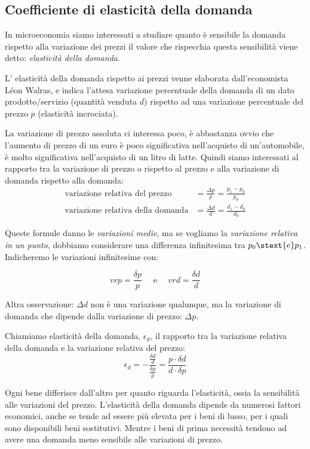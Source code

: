 \subsection{Coefficiente di elasticità della domanda}
\label{subsec:modelli_elasticita_domanda}

In microeconomia siamo interessati a studiare quanto è sensibile la domanda 
rispetto alla variazione dei prezzi il valore che rispecchia questa 
sensibilità viene detto: \emph{elasticità della domanda}.

L' elasticità della domanda rispetto ai prezzi venne elaborata 
dall'economista Léon Walras, e indica l'attesa variazione percentuale della 
domanda di un dato prodotto/servizio (quantità venduta \(d\)) rispetto ad una 
variazione percentuale del prezzo \(p\) (elasticità incrociata).

La variazione di prezzo assoluta ci interessa poco, è abbastanza ovvio che 
l'aumento di prezzo di un euro è poco significativa nell'acquisto di 
un'automobile, è molto significativa nell'acquisto di un litro di latte.
Quindi siamo interessati al rapporto tra la variazione di prezzo o rispetto 
al prezzo e alla variazione di domanda rispetto alla domanda:
\begin{align*}
\text{variazione relativa del prezzo} &= 
\frac{\Delta p}{p} = \frac{p_1 - p_0}{p_0} \\
\text{variazione relativa della domanda} &= 
\frac{\Delta d}{d} = \frac{d_1 - d_0}{d_0}
\end{align*}

Queste formule danno le \emph{variazioni medie}, ma se vogliamo la 
\emph{variazione relativa in un punto}, dobbiamo considerare una differenza 
infinitesima tra \(p_0 \stext{e} p_1\). 
Indicheremo le variazioni infinitesime con:

\[vrp = \frac{\delta p}{p} \quad \text{ e } \quad vrd = \frac{\delta d}{d}\]

Altra osservazione: \(\Delta d\) non è una variazione qualunque, ma la 
variazione di domanda che dipende dalla variazione di prezzo: \(\Delta p\).

Chiamiamo elasticità della domanda, \(\epsilon_d\), il rapporto tra la 
variazione relativa della domanda e la variazione relativa del prezzo:
\[\epsilon_d = -\frac {\frac {\delta d} {d} } { \frac {\delta p} {p}} =
\frac {p \cdot \delta d}{d \cdot \delta p}\]

Ogni bene differisce dall'altro per quanto riguarda l'elasticità, ossia la 
sensibilità alle variazioni del prezzo. L'elasticità della domanda dipende da 
numerosi fattori economici, anche se tende ad essere più elevata per i beni 
di lusso, per i quali sono disponibili beni sostitutivi. 
Mentre i beni di prima necessità tendono ad avere una domanda meno sensibile 
alle variazioni di prezzo.

